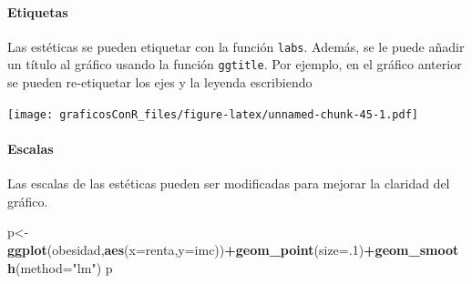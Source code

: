 \documentclass[]{article}
\newenvironment{Shaded}{\begin{snugshade}}{\end{snugshade}}
\newcommand{\DataTypeTok}[1]{\textcolor[rgb]{0.13,0.29,0.53}{#1}}
\newcommand{\DecValTok}[1]{\textcolor[rgb]{0.00,0.00,0.81}{#1}}
\newcommand{\KeywordTok}[1]{\textcolor[rgb]{0.13,0.29,0.53}{\textbf{#1}}}
\newcommand{\NormalTok}[1]{#1}
\newcommand{\OperatorTok}[1]{\textcolor[rgb]{0.81,0.36,0.00}{\textbf{#1}}}
\newcommand{\StringTok}[1]{\textcolor[rgb]{0.31,0.60,0.02}{#1}}
\let\oldparagraph\paragraph
\renewcommand{\paragraph}[1]{\oldparagraph{#1}\mbox{}}
\numberwithin{ejcnt}{section}
\begin{document}
\hypertarget{etiquetas}{%
\paragraph{Etiquetas}\label{etiquetas}}

Las estéticas se pueden etiquetar con la función \texttt{labs}. Además, se le puede añadir un título al gráfico usando la función \texttt{ggtitle}. Por ejemplo, en el gráfico anterior se pueden re-etiquetar los ejes y la leyenda escribiendo

\begin{Shaded}
\end{Shaded}

\texttt{[image: graficosConR\_files/figure-latex/unnamed-chunk-45-1.pdf]}

\hypertarget{escalas}{%
\paragraph{Escalas}\label{escalas}}

Las escalas de las estéticas pueden ser modificadas para mejorar la claridad del gráfico.

\begin{Shaded}
\begin{Highlighting}[]
\NormalTok{p<-}\KeywordTok{ggplot}\NormalTok{(obesidad,}\KeywordTok{aes}\NormalTok{(}\DataTypeTok{x=}\NormalTok{renta,}\DataTypeTok{y=}\NormalTok{imc))}\OperatorTok{+}\KeywordTok{geom_point}\NormalTok{(}\DataTypeTok{size=}\NormalTok{.}\DecValTok{1}\NormalTok{)}\OperatorTok{+}\KeywordTok{geom_smooth}\NormalTok{(}\DataTypeTok{method=}\StringTok{"lm"}\NormalTok{)}
\NormalTok{p }
\end{Highlighting}
\end{Shaded}
\end{document}
